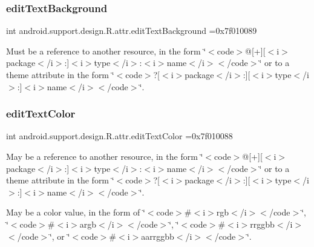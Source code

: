 \subsubsection{\texorpdfstring{edit\+Text\+Background}{editTextBackground}}
{\footnotesize\ttfamily int android.\+support.\+design.\+R.\+attr.\+edit\+Text\+Background =0x7f010089\hspace{0.3cm}{\ttfamily [static]}}

Must be a reference to another resource, in the form \char`\"{}$<$code$>$@\mbox{[}+\mbox{]}\mbox{[}$<$i$>$package$<$/i$>$\+:\mbox{]}$<$i$>$type$<$/i$>$\+:$<$i$>$name$<$/i$>$$<$/code$>$\char`\"{} or to a theme attribute in the form \char`\"{}$<$code$>$?\mbox{[}$<$i$>$package$<$/i$>$\+:\mbox{]}\mbox{[}$<$i$>$type$<$/i$>$\+:\mbox{]}$<$i$>$name$<$/i$>$$<$/code$>$\char`\"{}. \mbox{\label{classandroid_1_1support_1_1design_1_1R_1_1attr_a7a57b92b07f0f87e82599b0e12477273}} 
\subsubsection{\texorpdfstring{edit\+Text\+Color}{editTextColor}}
{\footnotesize\ttfamily int android.\+support.\+design.\+R.\+attr.\+edit\+Text\+Color =0x7f010088\hspace{0.3cm}{\ttfamily [static]}}

May be a reference to another resource, in the form \char`\"{}$<$code$>$@\mbox{[}+\mbox{]}\mbox{[}$<$i$>$package$<$/i$>$\+:\mbox{]}$<$i$>$type$<$/i$>$\+:$<$i$>$name$<$/i$>$$<$/code$>$\char`\"{} or to a theme attribute in the form \char`\"{}$<$code$>$?\mbox{[}$<$i$>$package$<$/i$>$\+:\mbox{]}\mbox{[}$<$i$>$type$<$/i$>$\+:\mbox{]}$<$i$>$name$<$/i$>$$<$/code$>$\char`\"{}. 

May be a color value, in the form of \char`\"{}$<$code$>$\#$<$i$>$rgb$<$/i$>$$<$/code$>$\char`\"{}, \char`\"{}$<$code$>$\#$<$i$>$argb$<$/i$>$$<$/code$>$\char`\"{}, \char`\"{}$<$code$>$\#$<$i$>$rrggbb$<$/i$>$$<$/code$>$\char`\"{}, or \char`\"{}$<$code$>$\#$<$i$>$aarrggbb$<$/i$>$$<$/code$>$\char`\"{}. \mbox{\label{classandroid_1_1support_1_1design_1_1R_1_1attr_a96bb8f72045bd97b7c4de5d060456b84}} 
